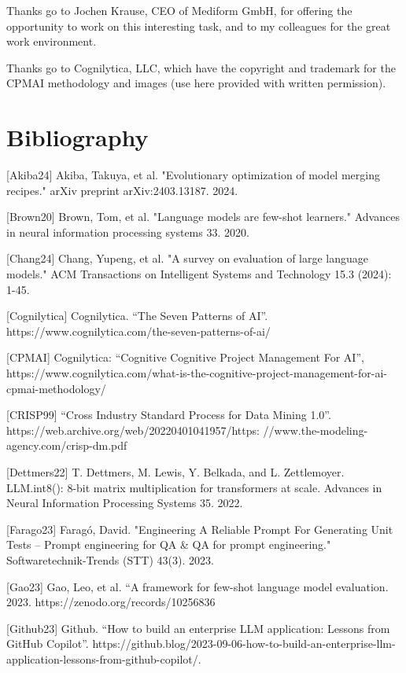 \documentclass[twocolumn]{article}
\begin{document}
Thanks go to Jochen Krause, CEO of Mediform GmbH, for offering the opportunity to work on this interesting task, and to my colleagues for the great work environment.

Thanks go to Cognilytica, LLC, which have the copyright and trademark for the CPMAI methodology and images (use here provided with written permission).


\section{Bibliography}

\hspace{3ex}[Akiba24] Akiba, Takuya, et al. "Evolutionary optimization of model merging recipes." arXiv preprint arXiv:2403.13187. 2024.

[Brown20] Brown, Tom, et al. "Language models are few-shot learners." Advances in neural information processing systems 33. 2020.

[Chang24] Chang, Yupeng, et al. "A survey on evaluation of large language models." ACM Transactions on Intelligent Systems and Technology 15.3 (2024): 1-45.

[Cognilytica] Cognilytica. “The Seven Patterns of AI”. https://www.cognilytica.com/the-seven-patterns-of-ai/

[CPMAI] Cognilytica: “Cognitive Cognitive Project Management For AI”, https://www.cognilytica.com/what-is-the-cognitive-project-management-for-ai-cpmai-methodology/

[CRISP99] “Cross Industry Standard Process for Data Mining 1.0”. https://web.archive.org/web/20220401041957/https:
//www.the-modeling-agency.com/crisp-dm.pdf

[Dettmers22] T. Dettmers, M. Lewis, Y. Belkada, and L. Zettlemoyer. LLM.int8(): 8-bit matrix multiplication for transformers at scale. Advances in Neural Information Processing Systems 35. 2022.

[Farago23] Faragó, David. "Engineering A Reliable Prompt For Generating Unit Tests -- Prompt engineering for QA \& QA for prompt engineering." Softwaretechnik-Trends (STT) 43(3). 2023.

[Gao23] Gao, Leo, et al. “A framework for few-shot language model evaluation. 2023. https://zenodo.org/records/10256836

[Github23] Github. “How to build an enterprise LLM application: Lessons from GitHub Copilot”. https://github.blog/2023-09-06-how-to-build-an-enterprise-llm-application-lessons-from-github-copilot/.
\end{document}
